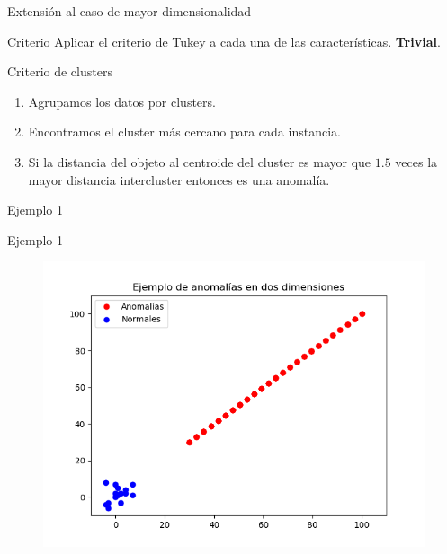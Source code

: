 \documentclass[10pt]{beamer}
\begin{document}
\begin{frame}[fragile]{Extensión al caso de mayor dimensionalidad}
\vspace{10px}
\pause
{}

\begin{block}{Criterio}
	Aplicar el criterio de Tukey a cada una de las características.
	\pause
	\textbf{\underline{Trivial}}.
\end{block}

\pause

\begin{block}{Criterio de clusters}
	\begin{enumerate}
		\item Agrupamos los datos por clusters.
		\pause
		\item Encontramos el cluster más cercano para cada instancia.
		\pause
		\item Si la distancia del objeto al centroide del cluster es mayor que $1.5$ veces la mayor
		distancia intercluster entonces es una anomalía.
	\end{enumerate}
\end{block}

\end{frame}

\begin{frame}[fragile]{Ejemplo 1}
\vspace{10px}
\centering
{}

\end{frame}

\begin{frame}[fragile]{Ejemplo 1}
\vspace{10px}

\begin{figure}
	\centering
	\includegraphics[scale=0.6]{Imagenes/outlier-2d-case1.png}
\end{figure}

\end{frame}
\end{document}
